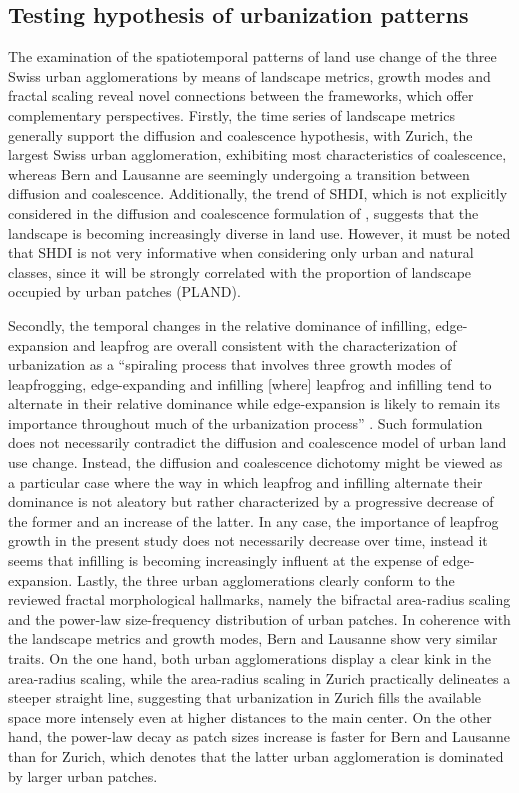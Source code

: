 \subsection*{Testing hypothesis of urbanization patterns}

The examination of the spatiotemporal patterns of land use change of the three Swiss urban agglomerations by means of landscape metrics, growth modes and fractal scaling reveal novel connections between the frameworks, which offer complementary perspectives.
Firstly, the time series of landscape metrics generally support the diffusion and coalescence hypothesis, with Zurich, the largest Swiss urban agglomeration, exhibiting most characteristics of coalescence, whereas Bern and Lausanne are seemingly undergoing a transition between diffusion and coalescence. Additionally, the trend of SHDI, which is not explicitly considered in the diffusion and coalescence formulation of \cite{dietzel2005spatio}, suggests that the landscape is becoming increasingly diverse in land use.
However, it must be noted that SHDI is not very informative when considering only urban and natural classes, since it will be strongly correlated with the proportion of landscape occupied by urban patches (PLAND).

Secondly, the temporal changes in the relative dominance of infilling, edge-expansion and leapfrog are overall consistent with the characterization of urbanization as a ``spiraling process that involves three growth modes of leapfrogging, edge-expanding and infilling [where] leapfrog and infilling tend to alternate in their relative dominance while edge-expansion is likely to remain its importance throughout much of the urbanization process'' \citep{li2013quantifying}. %
Such formulation does not necessarily contradict the diffusion and coalescence model of urban land use change.
Instead, the diffusion and coalescence dichotomy might be viewed as a particular case where the way in which leapfrog and infilling alternate their dominance is not aleatory but rather characterized by a progressive decrease of the former and an increase of the latter.
In any case, the importance of leapfrog growth in the present study does not necessarily decrease over time, instead it seems that infilling is becoming increasingly influent at the expense of edge-expansion.
Lastly, the three urban agglomerations clearly conform to the reviewed fractal morphological hallmarks, namely the bifractal area-radius scaling and the power-law size-frequency distribution of urban patches.
In coherence with the landscape metrics and growth modes, Bern and Lausanne show very similar traits. On the one hand, both urban agglomerations display a clear kink in the area-radius scaling, while the area-radius scaling in Zurich practically delineates a steeper straight line, suggesting that urbanization in Zurich fills the available space more intensely even at higher distances to the main center. On the other hand, the power-law decay as patch sizes increase is faster for Bern and Lausanne than for Zurich, which denotes that the latter urban agglomeration is dominated by larger urban patches.

